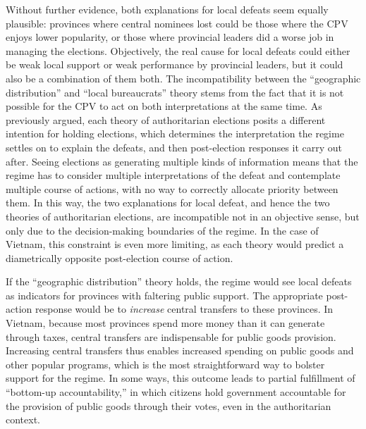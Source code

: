 \documentclass[12pt]{article}\usepackage[]{graphicx}\usepackage[]{color}
\newcommand{\1}{\mathbbm{1}}
\begin{document}
Without further evidence, both explanations for local defeats seem equally plausible: provinces where central nominees lost could be those where the CPV enjoys lower popularity, or those where provincial leaders did a worse job in managing the elections. Objectively, the real cause for local defeats could either be weak local support or weak performance by provincial leaders, but it could also be a combination of them both. The incompatibility between the ``geographic distribution'' and ``local bureaucrats'' theory stems from the fact that it is not possible for the CPV to act on both interpretations at the same time. As previously argued, each theory of authoritarian elections posits a different intention for holding elections, which determines the interpretation the regime settles on to explain the defeats, and then post-election responses it carry out after. Seeing elections as generating multiple kinds of information means that the regime has to consider multiple interpretations of the defeat and contemplate multiple course of actions, with no way to correctly allocate priority between them.  In this way, the two explanations for local defeat, and hence the two theories of authoritarian elections, are incompatible not in an objective sense, but only due to the decision-making boundaries of the regime. In the case of Vietnam, this constraint is even more limiting, as each theory would predict a diametrically opposite post-election course of action.

If the ``geographic distribution'' theory holds, the regime would see local defeats as indicators for provinces with faltering public support. The appropriate post-action response would be to \textit{increase} central transfers to these provinces. In Vietnam, because most provinces spend more money than it can generate through taxes, central transfers are indispensable for public goods provision. Increasing central transfers thus enables increased spending on public goods and other popular programs, which is the most straightforward way to bolster support for the regime. In some ways, this outcome leads to partial fulfillment of ``bottom-up accountability,'' in which citizens hold government accountable for the provision of public goods through their votes, even in the authoritarian context.
\end{document}
